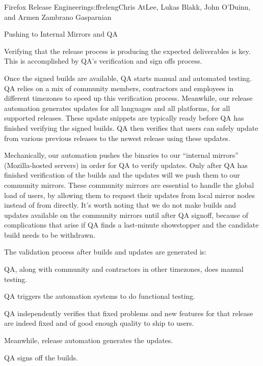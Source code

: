 \begin{aosachapter}{Firefox Release Engineering}{s:ffreleng}{Chris AtLee, Lukas Blakk, John O'Duinn, and Armen Zambrano Gasparnian}
\begin{aosasect1}{Pushing to Internal Mirrors and QA}

Verifying that the release process is producing the expected
deliverables is key. This
is accomplished by QA's verification and sign offs process.

Once the signed builds are available, QA starts manual and automated
testing. QA relies on a mix of community members,
contractors and employees in different timezones to speed up this
verification process. Meanwhile, our release automation generates
updates for all languages and all platforms, for all supported
releases.  These update snippets are typically ready before QA 
has finished verifying the signed builds. QA then verifies that users 
can safely update from various previous releases to the newest 
release using these updates. 

Mechanically, our automation pushes the binaries to our ``internal
mirrors'' (Mozilla-hosted servers) in order for QA to verify
updates. Only after QA has finished verification of the builds and
the updates will we push them to our
community mirrors. These community mirrors are essential to
handle the global load of users, by allowing them to request their updates
from local mirror nodes instead of from 
directly. It's worth noting that we do not make builds and updates
available on the community mirrors until after QA signoff, because of
complications that arise if QA finds a last-minute showstopper
and the candidate build needs to be withdrawn.

The validation process after builds and updates are generated is:

\begin{aosaitemize}

\item QA, along with community and contractors in other timezones, does
  manual testing.

\item QA triggers the automation systems to do functional testing.

\item QA independently verifies that fixed problems and new
  features for that release are indeed fixed and of good enough
  quality to ship to users.

\item Meanwhile, release automation generates the updates.

\item QA signs off the builds.


\end{aosaitemize}
\end{aosasect1}
\end{aosachapter}
